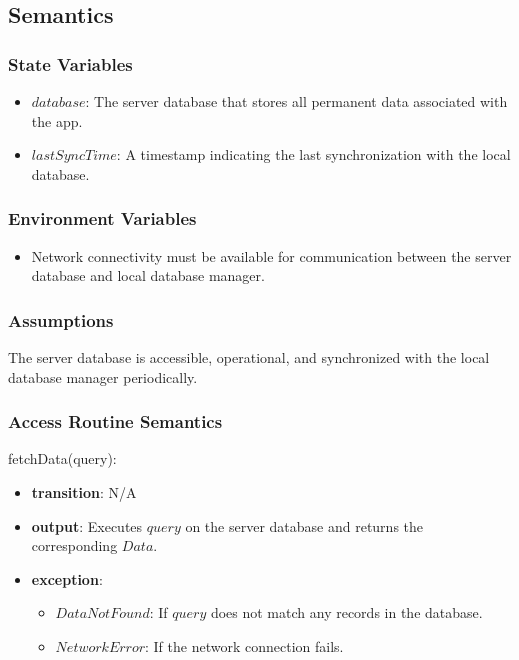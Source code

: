 \documentclass[12pt, titlepage]{article}
\begin{document}
\subsection{Semantics}

\subsubsection{State Variables}

\begin{itemize}
  \item \( database \): The server database that stores all permanent data associated with the app.
  \item \( lastSyncTime \): A timestamp indicating the last synchronization with the local database.
\end{itemize}

\subsubsection{Environment Variables}

\begin{itemize}
  \item Network connectivity must be available for communication between the server database and local database manager.
\end{itemize}

\subsubsection{Assumptions}

The server database is accessible, operational, and synchronized with the local database manager periodically.

\subsubsection{Access Routine Semantics}

\noindent fetchData(query):
\begin{itemize}
  \item \textbf{transition}: N/A
  \item \textbf{output}: Executes \( query \) on the server database and returns the corresponding \( Data \).
  \item \textbf{exception}:
        \begin{itemize}
          \item \( DataNotFound \): If \( query \) does not match any records in the database.
          \item \( NetworkError \): If the network connection fails.
        \end{itemize}
\end{itemize}
\end{document}
